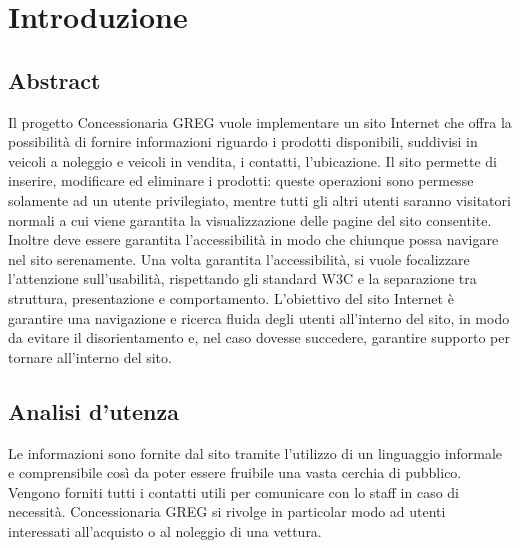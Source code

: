 \section{Introduzione}

\subsection{Abstract}
Il progetto Concessionaria GREG vuole implementare un sito Internet che offra la possibilità di fornire informazioni riguardo i prodotti disponibili, suddivisi in veicoli a noleggio e veicoli in vendita, i contatti, l'ubicazione. Il sito permette di inserire, modificare ed eliminare i prodotti: queste operazioni sono permesse solamente ad un utente privilegiato, mentre tutti gli altri utenti saranno visitatori normali a cui viene garantita la visualizzazione delle pagine del sito consentite. Inoltre deve essere garantita l'accessibilità in modo che chiunque possa navigare nel sito serenamente. Una volta garantita l'accessibilità, si vuole focalizzare l'attenzione sull'usabilità, rispettando gli standard W3C e la separazione tra struttura, presentazione e comportamento. L'obiettivo del sito Internet è garantire una navigazione e ricerca fluida degli utenti all'interno del sito, in modo da evitare il disorientamento e, nel caso dovesse succedere, garantire supporto per tornare all'interno del sito.

\subsection{Analisi d'utenza}
Le informazioni sono fornite dal sito tramite l'utilizzo di un linguaggio informale e comprensibile così da poter essere fruibile una vasta cerchia di pubblico. Vengono forniti tutti i contatti utili per comunicare con lo staff in caso di necessità. Concessionaria GREG si rivolge in particolar modo ad utenti interessati all'acquisto o al noleggio di una vettura.

\pagebreak